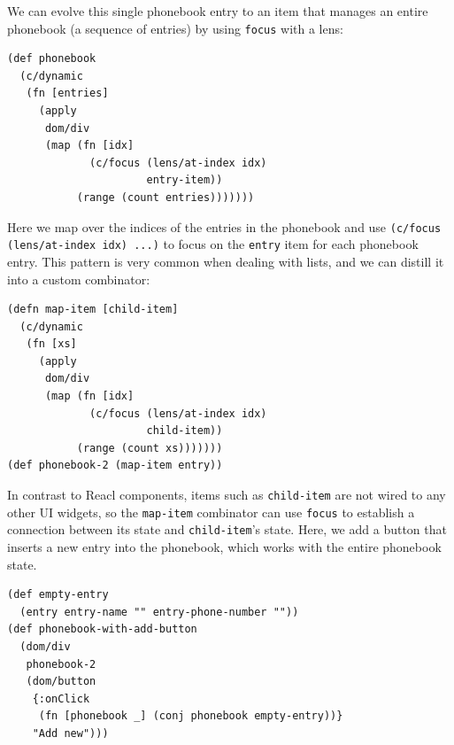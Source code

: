 \documentclass[sigplan,screen]{acmart}
\begin{document}
%
We can evolve this
single phonebook entry to an item that manages an
entire phonebook (a sequence of entries) by using \texttt{focus}
with a lens:
%
\begin{verbatim}
(def phonebook
  (c/dynamic
   (fn [entries]
     (apply
      dom/div
      (map (fn [idx]
             (c/focus (lens/at-index idx)
                      entry-item))
           (range (count entries)))))))
\end{verbatim}
%
Here we map over the indices of the entries in the phonebook and use
\texttt{(c/focus (lens/at-index idx) ...)} to focus on the \texttt{entry}
item for each phonebook entry.
%
This pattern is very common when
dealing with lists, and we can
distill it into a custom combinator:
%
\begin{verbatim}
(defn map-item [child-item]
  (c/dynamic
   (fn [xs]
     (apply
      dom/div
      (map (fn [idx]
             (c/focus (lens/at-index idx)
                      child-item))
           (range (count xs)))))))
(def phonebook-2 (map-item entry))
\end{verbatim}
%
In contrast to Reacl components, items such as \texttt{child-item} are
not wired to any other UI widgets, so the \texttt{map-item} combinator
can use \texttt{focus} to establish a connection between its state and
\texttt{child-item}'s state.
Here, we add
a button that inserts a new entry into the
phonebook, which works with the entire phonebook state.
%
\begin{verbatim}
(def empty-entry
  (entry entry-name "" entry-phone-number ""))
(def phonebook-with-add-button
  (dom/div
   phonebook-2
   (dom/button
    {:onClick
     (fn [phonebook _] (conj phonebook empty-entry))}
    "Add new")))
\end{verbatim}
%
\end{document}
